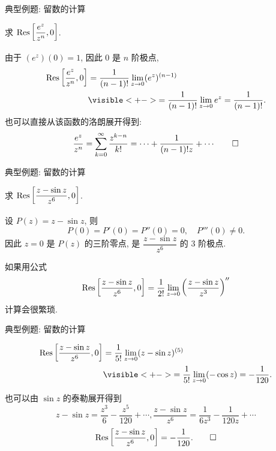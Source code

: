 \begin{frame}{典型例题: 留数的计算}
\beqskip{5pt}
\begin{example}
求 ${\mathrm{Res}}\left[\dfrac{e^z}{z^n},0\right]$.
\end{example}
\begin{solution}
由于 $(e^z)(0)=1$, 因此 $0$ 是 $n$ 阶极点,
\onslide<+->
\begin{align*}
\Res\left[\frac{e^z}{z^n},0\right]
&=\frac1{(n-1)!}\lim_{z\to0}(e^z)^{(n-1)}\\
&\visible<+->{=\frac1{(n-1)!}\lim_{z\to0}e^z
=\frac1{(n-1)!}.}
\end{align*}
\onslide<+->
也可以直接从该函数的洛朗展开得到:
\[\frac{e^z}{z^n}=\sum_{k=0}^\infty\frac{z^{k-n}}{k!}
=\cdots+\frac1{(n-1)!z}+\cdots\qedhere\]
\end{solution}
\endgroup
\end{frame}


\begin{frame}{典型例题: 留数的计算}
\beqskip{5pt}
\begin{example}
求 ${\mathrm{Res}}\left[\dfrac{z-\sin z}{z^6},0\right]$.
\end{example}
\begin{solutions}
\indent
设 $P(z)=z-\sin z$, 则
\[P(0)=P'(0)=P''(0)=0,\quad P'''(0)\neq 0.\]
\onslide<+->
因此 $z=0$ 是 $P(z)$ 的三阶零点,
\onslide<+->
是 $\dfrac{z-\sin z}{z^6}$ 的 $3$ 阶极点.

\indent
\onslide<+->
如果用公式
\[{\mathrm{Res}}\left[\frac{z-\sin z}{z^6},0\right]
=\frac1{2!}\lim_{z\to0}\left(\frac{z-\sin z}{z^3}\right)''\]
计算会很繁琐.
\end{solutions}
\endgroup
\end{frame}


\begin{frame}{典型例题: 留数的计算}
\begin{solutione}
\vspace{-\baselineskip}
\begin{align*}
\Res\left[\frac{z-\sin z}{z^6},0\right]
&=\frac1{5!}\lim_{z\to0}(z-\sin z)^{(5)}\\
&\visible<+->{=\frac1{5!}\lim_{z\to0}(-\cos z)=-\frac1{120}.}
\end{align*}

\indent
\onslide<+->
也可以由 $\sin z$ 的泰勒展开得到
\[z-\sin z=\frac{z^3}6-\frac{z^5}{120}+\cdots,
\frac{z-\sin z}{z^6}=\frac1{6z^3}-\frac1{120z}+\cdots\]
\onslide<+->
\[{\mathrm{Res}}\left[\frac{z-\sin z}{z^6},0\right]=-\frac1{120}.\qedhere\]
\end{solutione}
\end{frame}


